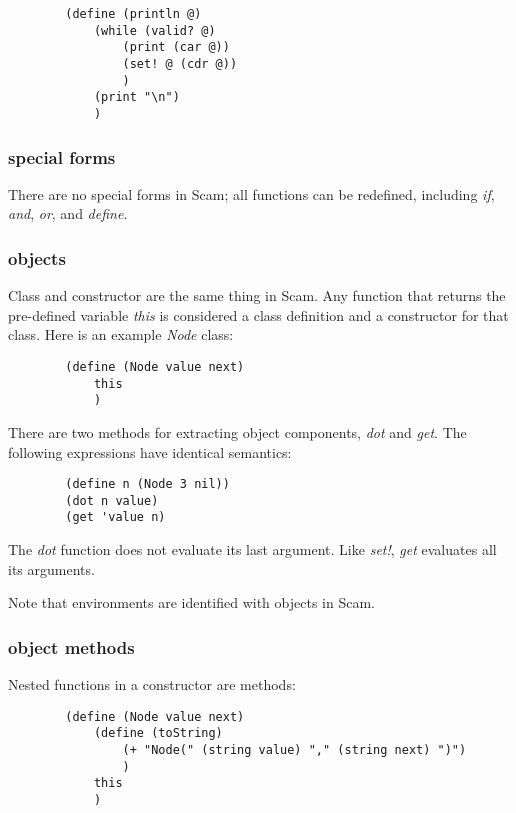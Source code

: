 \documentclass{article}
\begin{document}
\begin{verbatim}
        (define (println @)
            (while (valid? @)
                (print (car @))
                (set! @ (cdr @))
                )
            (print "\n")
            )
\end{verbatim}

\subsubsection*{special forms}

    There are no special forms in Scam; all functions can be
    redefined, including {\it if}, {\it and}, {\it or}, and {\it define}.

\subsubsection*{objects}

    Class and constructor are the same thing in Scam. Any function that
    returns the pre-defined variable {\it this} is considered a class
    definition and a constructor for that class. Here is an example
    {\it Node} class:

\begin{verbatim}
        (define (Node value next)
            this
            )
\end{verbatim}

    There are two methods for extracting object components, {\it dot} and
    {\it get}. The following expressions have identical semantics:

\begin{verbatim}
        (define n (Node 3 nil))
        (dot n value)
        (get 'value n)
\end{verbatim}

    The {\it dot} function does not evaluate its last argument.
    Like {\it set!}, {\it get} evaluates all its arguments.

    Note that environments are identified with objects in Scam.

\subsubsection*{object methods}

    Nested functions in a constructor are methods:

\begin{verbatim}
        (define (Node value next)
            (define (toString)
                (+ "Node(" (string value) "," (string next) ")")
                )
            this
            )
\end{verbatim}
\end{document}
